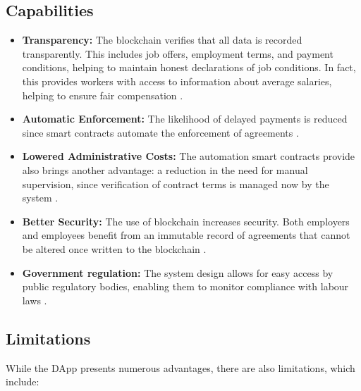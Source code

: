 \subsection{Capabilities}

\begin{itemize}
    \item \textbf{Transparency:} The blockchain verifies that all data is recorded transparently. This includes job offers, employment terms, and payment conditions, helping to maintain honest declarations of job conditions. In fact, this provides workers with access to information about average salaries, helping to ensure fair compensation \cite{lallaiETAL2020software}.
    \item \textbf{Automatic Enforcement:} The likelihood of delayed payments is reduced since smart contracts automate the enforcement of agreements \cite{lallaiETAL2020software}.
    \item \textbf{Lowered Administrative Costs:} The automation smart contracts provide also brings another advantage: a reduction in the need for manual supervision, since verification of contract terms is managed now by the system \cite{lallaiETAL2020software}.
    \item \textbf{Better Security:} The use of blockchain increases security. Both employers and employees benefit from an immutable record of agreements that cannot be altered once written to the blockchain \cite{lallaiETAL2020software}.
    \item \textbf{Government regulation:} The system design allows for easy access by public regulatory bodies, enabling them to monitor compliance with labour laws \cite{lallaiETAL2020software}.
\end{itemize}

\subsection{Limitations}

While the DApp presents numerous advantages, there are also limitations, which include:

